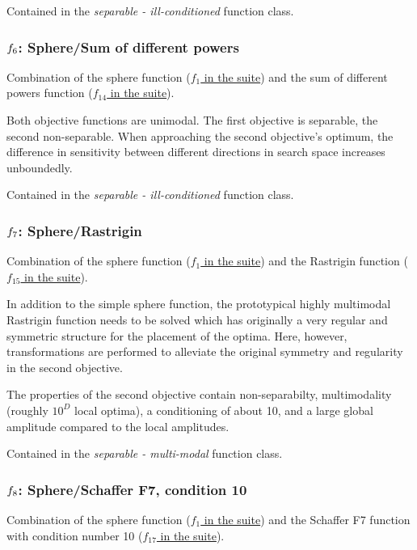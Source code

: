 \documentclass[letterpaper,12pt,english]{article}
\begin{document}
Contained in the \emph{separable - ill-conditioned} function class.


\subsubsection{\protect\(f_6\protect\): Sphere/Sum of different powers}
\label{index:sphere-sum-of-different-powers}\label{index:f6}
Combination of the sphere function (\href{http://coco.lri.fr/downloads/download15.03/bbobdocfunctions.pdf\#page=5}{\(f_1\) in the  suite})
and the sum of different powers function (\href{http://coco.lri.fr/downloads/download15.03/bbobdocfunctions.pdf\#page=70}{\(f_{14}\) in the  suite}).

Both objective functions are unimodal. The first objective is
separable, the second non-separable.
When approaching the second objective's optimum, the difference
in sensitivity between different directions in search space
increases unboundedly.

Contained in the \emph{separable - ill-conditioned} function class.


\subsubsection{\protect\(f_7\protect\): Sphere/Rastrigin}
\label{index:sphere-rastrigin}\label{index:f7}
Combination of the sphere function (\href{http://coco.lri.fr/downloads/download15.03/bbobdocfunctions.pdf\#page=5}{\(f_1\) in the  suite})
and the Rastrigin function (\href{http://coco.lri.fr/downloads/download15.03/bbobdocfunctions.pdf\#page=75}{\(f_{15}\) in the  suite}).

In addition to the simple sphere function, the prototypical highly
multimodal Rastrigin function needs to be solved which has originally
a very regular and symmetric structure for the placement of the optima.
Here, however, transformations are performed to alleviate
the original symmetry and regularity in the second objective.

The properties of the second objective contain non-separabilty,
multimodality (roughly \(10^D\) local optima), a conditioning of
about 10, and a large global amplitude compared to the local amplitudes.

Contained in the \emph{separable - multi-modal} function class.


\subsubsection{\protect\(f_8\protect\): Sphere/Schaffer F7, condition 10}
\label{index:f8}\label{index:sphere-schaffer-f7-condition-10}
Combination of the sphere function (\href{http://coco.lri.fr/downloads/download15.03/bbobdocfunctions.pdf\#page=5}{\(f_1\) in the  suite})
and the Schaffer F7 function with condition number 10 (\href{http://coco.lri.fr/downloads/download15.03/bbobdocfunctions.pdf\#page=85}{\(f_{17}\) in the  suite}).
\end{document}
